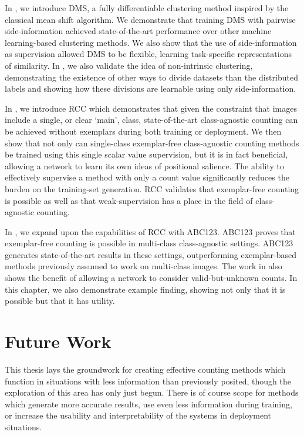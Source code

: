 \documentclass[../thesis.tex]{subfiles}
\begin{document}
In , we introduce DMS, a fully differentiable clustering method inspired by the classical mean shift algorithm.
We demonstrate that training DMS with pairwise side-information achieved state-of-the-art performance over other machine learning-based clustering methods. 
We also show that the use of side-information as supervision allowed DMS to be flexible, learning task-specific representations of similarity.
In , we also validate the idea of non-intrinsic clustering, demonstrating the existence of other ways to divide datasets than the distributed labels and showing how these divisions are learnable using only side-information.

In , we introduce RCC which demonstrates that given the constraint that images include a single, or clear `main', class, state-of-the-art class-agnostic counting can be achieved without exemplars during both training or deployment.  
We then show that not only can single-class exemplar-free class-agnostic counting methods be trained using this single scalar value supervision, but it is in fact beneficial, allowing a network to learn its own ideas of positional salience.
The ability to effectively supervise a method with only a count value significantly reduces the burden on the training-set generation.
RCC validates that exemplar-free counting is possible as well as that weak-supervision has a place in the field of class-agnostic counting.




In , we expand upon the capabilities of RCC with ABC123.
ABC123 proves that exemplar-free counting is possible in multi-class class-agnostic settings.
ABC123 generates state-of-the-art results in these settings, outperforming exemplar-based methods previously assumed to work on multi-class images. 
The work in  also shows the benefit of allowing a network to consider valid-but-unknown counts.  
In this chapter, we also demonstrate example finding, showing not only that it is possible but that it has utility.


\section{Future Work}



This thesis lays the groundwork for creating effective counting methods which function in situations with less information than previously posited, though the exploration of this area has only just begun.
There is of course scope for methods which generate more accurate results, use even less information during training, or increase the usability and interpretability of the systems in deployment situations.
\end{document}
